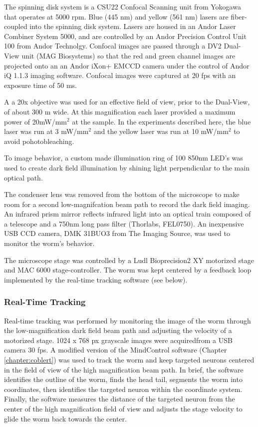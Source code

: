 The spinning disk system is a CSU22 Confocal Scanning unit from Yokogawa that operates at 5000 rpm. Blue (445 nm) and yellow (561 nm) lasers are fiber-coupled into the spinning disk system. Lasers are housed in an  Andor Laser Combiner System 5000, and are controlled by an Andor Precision Control Unit 100 from Andor Technolgy. Confocal images are passed through a DV2 Dual-View  unit (MAG Biosystems) so that the red and green channel images are projected onto an an Andor iXon+ EMCCD camera under the control of Andor iQ 1.1.3 imaging software. Confocal images were captured at 20 fps with an exposure time of 50 ms. 

 A a 20x objective was used for an effective field of view, prior to the Dual-View, of about 300 \textmu m wide. At this magnification each laser  provided a maximum power of 20mW/mm$^2$ at the sample. In the experiments described here, the blue laser was run at 3 mW/mm$^2$ and the yellow laser was run at 10 mW/mm$^2$ to avoid pohotobleaching.

To image behavior, a custom made illumination ring of 100 850nm LED's was used to create dark field illumination by shining light  perpendicular to the main optical path. 

The condenser lens was removed from the bottom of the microscope to make room for a second low-magnifcation beam path to record the dark field imaging. An infrared prism mirror reflects infrared light into an optical train composed of a telescope and a 750nm long pass filter (Thorlabs, FEL0750).  An inexpensive USB CCD camera, DMK 31BUO3 from The Imaging Source,  was used to monitor the worm's behavior.  

The microscope stage was controlled by a Ludl Bioprecision2 XY motorized stage and MAC 6000 stage-controller. The worm was kept centered by a  feedback loop implemented by the real-time tracking software (see below).

\subsubsection{Real-Time Tracking} \label{sec:omegaSoftware}
Real-time tracking was performed by monitoring the image of the worm through the low-magnification dark field beam path and adjusting the velocity of a motorized stage. 1024 x 768 px grayscale images were acquiredfrom a USB camera 30 fps. A modified version of the MindControl software (Chapter \ref{chapter:coblert}) was used to track the worm and keep targeted neurons centered in the field of view of the high magnification beam path. In brief, the software identifies the outline of the worm, finds the head tail, segments the worm into coordinates, then identifies the targeted neuron within the coordinate system. Finally, the software measures the distance of the targeted neuron from the center of the high magnification field of view and adjusts the stage velocity to glide the worm back towards the center.

